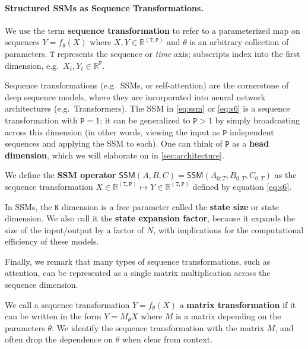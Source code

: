 \paragraph{Structured SSMs as Sequence Transformations.}

\begin{definition}
  \label{def:sequence-transformation}
We use the term \textbf{sequence transformation} to refer to a parameterized map on sequences $Y = f_{\theta}(X)$ where $X, Y \in \mathbb{R}^{\mathtt{(T,P)}}$ and $\theta$ is an arbitrary collection of parameters.
$\mathtt{T}$ represents the sequence or \emph{time} axis; subscripts index into the first dimension, e.g.\ $X_t, Y_t \in \mathbb{R}^\mathtt{P}$.
\end{definition}

Sequence transformations (e.g.\ SSMs, or self-attention) are the cornerstone of deep sequence models, where they are incorporated into neural network architectures (e.g.\ Transformers). The SSM in \eqref{eq:ssm} or \eqref{eq:s6} is a sequence transformation with $\mathtt{P}=1$; it can be generalized to $\mathtt{P} > 1$ by simply broadcasting across this dimension (in other words, viewing the input as $\mathtt{P}$ independent sequences and applying the SSM to each). One can think of $\mathtt{P}$ as a \textbf{head dimension}, which we will elaborate on in \ref{sec:architecture}.

\begin{definition}
  \label{def:ssm}
  We define the \textbf{SSM operator}
    $\mathsf{SSM}(A, B, C) = \mathsf{SSM}(A_{0:T}, B_{0:T}, C_{0:T})$ as the sequence transformation $X \in \mathbb{R}^{\mathtt{(T,P)}} \mapsto Y \in \mathbb{R}^{\mathtt{(T,P)}}$
    defined by equation \eqref{eq:s6}.

\end{definition}

In SSMs, the $\mathtt{N}$ dimension is a free parameter called the \textbf{state size} or state dimension. We also call it the \textbf{state expansion factor}, because it expands the size of the input/output by a factor of $N$, with implications for the computational efficiency of these models.

Finally, we remark that many types of sequence transformations, such as attention, can be represented as a single matrix multiplication across the sequence dimension.

\begin{definition}
  \label{def:matrix-transformation}
  We call a sequence transformation $Y = f_\theta(X)$ a \textbf{matrix transformation} if it can be written in the form $Y = M_\theta X$ where $M$ is a matrix depending on the parameters $\theta$.
  We identify the sequence transformation with the matrix $M$, and often drop the dependence on $\theta$ when clear from context.
\end{definition}

